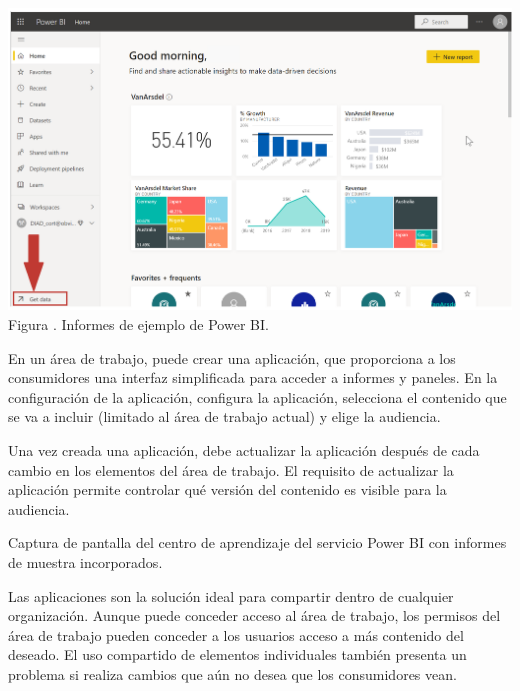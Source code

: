 \documentclass[12pt]{report}
\newcounter{it}
\theoremstyle{largebreak}
\newcounter{figcount}
\begin{document}
    \begin{minipage}{\textwidth}
      \begin{center}
          \includegraphics[scale=0.5]{images/02.png}\\
          Figura \thefigcount. Informes de ejemplo de Power BI.
        \end{center}
    \end{minipage}

    En un área de trabajo, puede crear una aplicación, que proporciona a los consumidores una interfaz simplificada para acceder a informes y paneles. En la configuración de la aplicación, configura la aplicación, selecciona el contenido que se va a incluir (limitado al área de trabajo actual) y elige la audiencia.

    Una vez creada una aplicación, debe actualizar la aplicación después de cada cambio en los elementos del área de trabajo. El requisito de actualizar la aplicación permite controlar qué versión del contenido es visible para la audiencia.

    Captura de pantalla del centro de aprendizaje del servicio Power BI con informes de muestra incorporados.

    Las aplicaciones son la solución ideal para compartir dentro de cualquier organización. Aunque puede conceder acceso al área de trabajo, los permisos del área de trabajo pueden conceder a los usuarios acceso a más contenido del deseado. El uso compartido de elementos individuales también presenta un problema si realiza cambios que aún no desea que los consumidores vean.
\end{document}
